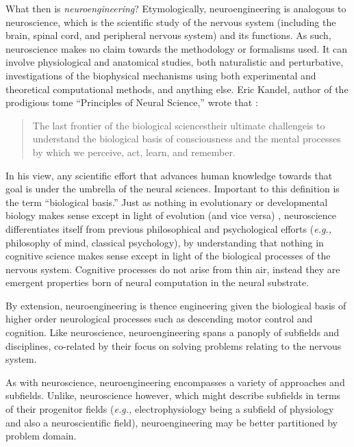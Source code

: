 \documentclass[11pt]{diazessay} %
\begin{document}
What then is \textit{neuroengineering}? Etymologically, neuroengineering is analogous to neuroscience,
which is the scientific study of the nervous system (including the brain, spinal cord, and peripheral nervous system)
and its functions.
As such, neuroscience makes no claim towards the methodology or formalisms used.
It can involve physiological and anatomical studies, both naturalistic and perturbative,
investigations of the biophysical mechanisms using both experimental and theoretical computational methods,
and anything else.
Eric Kandel, author of the prodigious tome ``Principles of Neural Science,'' wrote that \cite{kandelPrinciplesNeuralScience2013a}:

\begin{quote}
	The last frontier of the biological sciences\textemdash{}their ultimate challenge\textemdash{}is to understand
	the biological basis of consciousness and the mental processes by which we perceive, act, learn, and remember.
\end{quote}

In his view, any scientific effort that advances human knowledge towards that goal is under the umbrella of the neural sciences.
Important to this definition is the term ``biological basis.''
Just as nothing in evolutionary or developmental biology makes sense except in light of evolution
(and vice versa) \cite{reiskindNothingEvolutionMakes2021},
neuroscience differentiates itself from previous philosophical and psychological efforts (\textit{e.g.,} 
philosophy of mind, classical psychology),
by understanding that nothing in cognitive science makes sense
except in light of the biological processes of the nervous system.
Cognitive processes do not arise from thin air, instead they are emergent properties
born of neural computation in the neural substrate.

By extension, neuroengineering is thence engineering given the biological basis of higher
order neurological processes such as descending motor control and cognition.
Like neuroscience, neuroengineering spans a panoply of subfields and disciplines,
co-related by their focus on solving problems relating to the nervous system.

As with neuroscience, neuroengineering encompasses a variety of approaches and subfields.
Unlike, neuroscience however, which might describe subfields in terms of their progenitor fields
(\textit{e.g.,} electrophysiology being a subfield of physiology and also a neuroscientific field),
neuroengineering may be better partitioned by problem domain.
\end{document}
